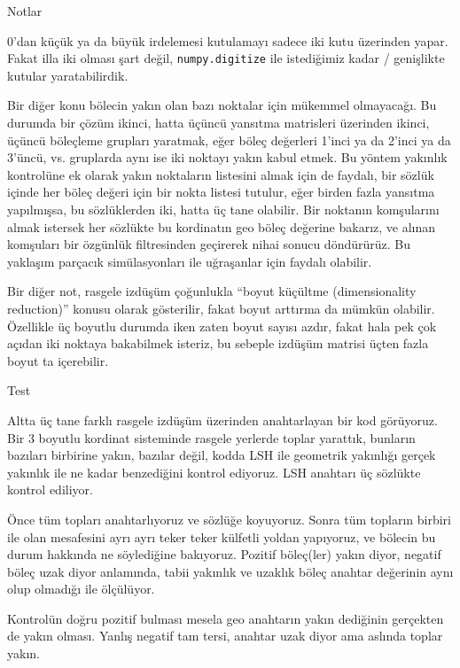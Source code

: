 \documentclass[12pt,fleqn]{article}\usepackage{../../common}
\begin{document}
Notlar

0'dan küçük ya da büyük irdelemesi kutulamayı sadece iki kutu üzerinden
yapar. Fakat illa iki olması şart değil, \verb!numpy.digitize! ile istediğimiz
kadar / genişlikte kutular yaratabilirdik.

Bir diğer konu bölecin yakın olan bazı noktalar için mükemmel olmayacağı. Bu
durumda bir çözüm ikinci, hatta üçüncü yansıtma matrisleri üzerinden ikinci,
üçüncü böleçleme grupları yaratmak, eğer böleç değerleri 1'inci ya da 2'inci ya
da 3'üncü, vs. gruplarda aynı ise iki noktayı yakın kabul etmek. Bu yöntem
yakınlık kontrolüne ek olarak yakın noktaların listesini almak için de faydalı,
bir sözlük içinde her böleç değeri için bir nokta listesi tutulur, eğer birden
fazla yansıtma yapılmışsa, bu sözlüklerden iki, hatta üç tane olabilir. Bir
noktanın komşularını almak istersek her sözlükte bu kordinatın geo böleç
değerine bakarız, ve alınan komşuları bir özgünlük filtresinden geçirerek nihai
sonucu döndürürüz. Bu yaklaşım parçacık simülasyonları ile uğraşanlar için
faydalı olabilir.

Bir diğer not, rasgele izdüşüm çoğunlukla ``boyut küçültme (dimensionality
reduction)'' konusu olarak gösterilir, fakat boyut arttırma da mümkün
olabilir. Özellikle üç boyutlu durumda iken zaten boyut sayısı azdır, fakat hala
pek çok açıdan iki noktaya bakabilmek isteriz, bu sebeple izdüşüm matrisi üçten
fazla boyut ta içerebilir.

Test

Altta üç tane farklı rasgele izdüşüm üzerinden anahtarlayan bir kod
görüyoruz. Bir 3 boyutlu kordinat sisteminde rasgele yerlerde toplar yarattık,
bunların bazıları birbirine yakın, bazılar değil, kodda LSH ile geometrik
yakınlığı gerçek yakınlık ile ne kadar benzediğini kontrol ediyoruz. LSH
anahtarı üç sözlükte kontrol ediliyor.

Önce tüm topları anahtarlıyoruz ve sözlüğe koyuyoruz. Sonra tüm topların birbiri
ile olan mesafesini ayrı ayrı teker teker külfetli yoldan yapıyoruz, ve bölecin
bu durum hakkında ne söylediğine bakıyoruz. Pozitif böleç(ler) yakın diyor,
negatif böleç uzak diyor anlamında, tabii yakınlık ve uzaklık böleç anahtar
değerinin aynı olup olmadığı ile ölçülüyor.

Kontrolün doğru pozitif bulması mesela geo anahtarın yakın dediğinin gerçekten
de yakın olması. Yanlış negatif tam tersi, anahtar uzak diyor ama aslında toplar
yakın.
\end{document}
